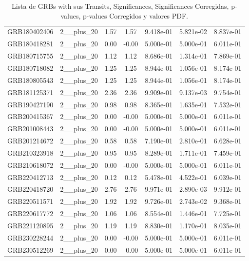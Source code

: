 \documentclass[12pt]{article}
\begin{document}
\begin{table}[h!]
{\begin{tabular}{l c c c c c c}
GRB180402406 & 2__plus_20 & 1.57 & 1.57 & 9.418e-01 & 5.821e-02 & 8.837e-01 \\
GRB180418281 & 2__plus_20 & 0.00 & -0.00 & 5.000e-01 & 5.000e-01 & 6.011e-01 \\
GRB180715755 & 2__plus_20 & 1.12 & 1.12 & 8.686e-01 & 1.314e-01 & 7.869e-01 \\
GRB180718082 & 2__plus_20 & 1.25 & 1.25 & 8.944e-01 & 1.056e-01 & 8.174e-01 \\
GRB180805543 & 2__plus_20 & 1.25 & 1.25 & 8.944e-01 & 1.056e-01 & 8.174e-01 \\
GRB181125371 & 2__plus_20 & 2.36 & 2.36 & 9.909e-01 & 9.137e-03 & 9.754e-01 \\
GRB190427190 & 2__plus_20 & 0.98 & 0.98 & 8.365e-01 & 1.635e-01 & 7.532e-01 \\
GRB200415367 & 2__plus_20 & 0.00 & -0.00 & 5.000e-01 & 5.000e-01 & 6.011e-01 \\
GRB201008443 & 2__plus_20 & 0.00 & -0.00 & 5.000e-01 & 5.000e-01 & 6.011e-01 \\
GRB201214672 & 2__plus_20 & 0.58 & 0.58 & 7.190e-01 & 2.810e-01 & 6.628e-01 \\
GRB210323918 & 2__plus_20 & 0.95 & 0.95 & 8.289e-01 & 1.711e-01 & 7.459e-01 \\
GRB210618072 & 2__plus_20 & 0.00 & -0.00 & 5.000e-01 & 5.000e-01 & 6.011e-01 \\
GRB220412713 & 2__plus_20 & 0.12 & 0.12 & 5.478e-01 & 4.522e-01 & 6.039e-01 \\
GRB220418720 & 2__plus_20 & 2.76 & 2.76 & 9.971e-01 & 2.890e-03 & 9.912e-01 \\
GRB220511571 & 2__plus_20 & 1.92 & 1.92 & 9.726e-01 & 2.743e-02 & 9.368e-01 \\
GRB220617772 & 2__plus_20 & 1.06 & 1.06 & 8.554e-01 & 1.446e-01 & 7.725e-01 \\
GRB221120895 & 2__plus_20 & 1.19 & 1.19 & 8.830e-01 & 1.170e-01 & 8.035e-01 \\
GRB230228244 & 2__plus_20 & 0.00 & -0.00 & 5.000e-01 & 5.000e-01 & 6.011e-01 \\
GRB230512269 & 2__plus_20 & 0.00 & -0.00 & 5.000e-01 & 5.000e-01 & 6.011e-01 \\
\bottomrule
\end{tabular}%
}
\caption{Lista de GRBs with sus Transits, Significances, Significances Corregidas, p-values, p-values Corregidos y valores PDF.}
\end{table}
\end{document}
